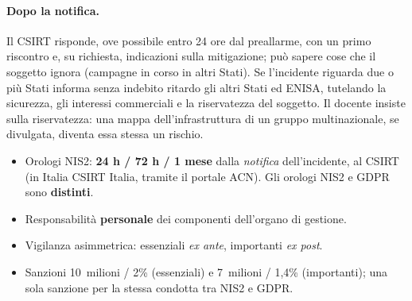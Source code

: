 \paragraph{Dopo la notifica.} Il CSIRT risponde, ove possibile entro 24 ore dal preallarme, con un
primo riscontro e, su richiesta, indicazioni sulla mitigazione; può sapere cose che il soggetto ignora
(campagne in corso in altri Stati). Se l'incidente riguarda due o più Stati informa senza indebito
ritardo gli altri Stati ed ENISA, tutelando la sicurezza, gli interessi commerciali e la riservatezza
del soggetto. Il docente insiste sulla riservatezza: una mappa dell'infrastruttura di un gruppo
multinazionale, se divulgata, diventa essa stessa un rischio.

\begin{esame}
\begin{itemize}
  \item Orologi NIS2: \textbf{24 h / 72 h / 1 mese} dalla \emph{notifica} dell'incidente, al CSIRT
    (in Italia CSIRT Italia, tramite il portale ACN). Gli orologi NIS2 e GDPR sono \textbf{distinti}.
  \item Responsabilità \textbf{personale} dei componenti dell'organo di gestione.
  \item Vigilanza asimmetrica: essenziali \emph{ex ante}, importanti \emph{ex post}.
  \item Sanzioni 10~milioni / 2\% (essenziali) e 7~milioni / 1,4\% (importanti); una sola sanzione per
    la stessa condotta tra NIS2 e GDPR.
\end{itemize}
\end{esame}

